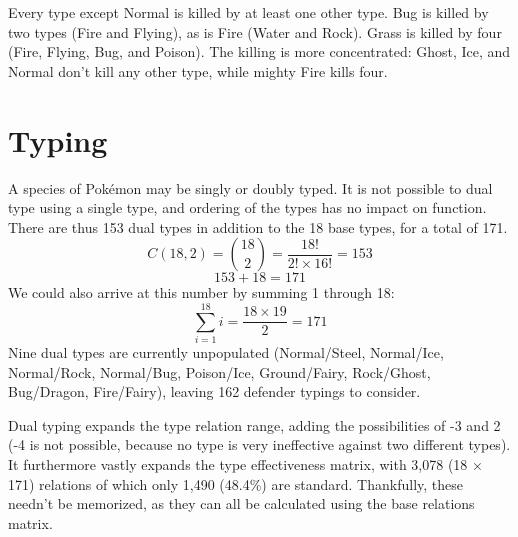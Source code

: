 %
Every type except Normal is killed by at least one other type.
Bug is killed by two types (Fire and Flying), as is Fire (Water and Rock).
Grass is killed by four (Fire, Flying, Bug, and Poison).
The killing is more concentrated: Ghost, Ice, and Normal don't kill
  any other type, while mighty Fire kills four.

\section{Typing}
\label{sec:dualtypes}
A species of Pokémon may be singly or doubly typed.
It is not possible to dual type using a single type, and ordering of the types has no impact on function.
There are thus 153 dual types in addition to the 18 base types, for a total of 171.
\[ C(18, 2) = \binom{18}{2} = \frac{18!}{2! \times 16!} = 153 \]
\[ 153 + 18 = 171 \]
We could also arrive at this number by summing 1 through 18:
\[ \sum_{i=1}^{18} i = \frac{18 \times 19}{2} = 171 \]
Nine dual types are currently unpopulated (Normal/Steel, Normal/Ice, Normal/Rock,
 Normal/Bug, Poison/Ice, Ground/Fairy, Rock/Ghost, Bug/Dragon, Fire/Fairy),
 leaving 162 defender typings to consider.

Dual typing expands the type relation range, adding the possibilities
 of -3 and 2 (-4 is not possible, because no type is very ineffective against
 two different types).
It furthermore vastly expands the type effectiveness matrix,
 with 3,078 (18 × 171) relations of which only 1,490 (48.4\%) are standard.
Thankfully, these needn't be memorized, as they can all be calculated
 using the base relations matrix.

